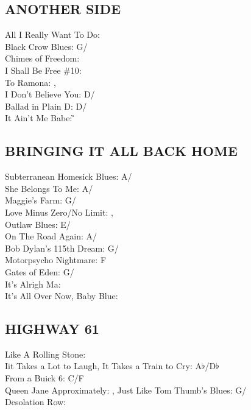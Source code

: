  \subsection{ANOTHER SIDE}
All I Really Want To Do: \A\\ Black Crow Blues: G/\C\\ Chimes of Freedom: \G\\ I Shall Be Free \#10: \G\\ To Ramona: \C,\\
 I Don't Believe You: D/\G\\ Ballad in Plain D: D/\G\\ It Ain't Me Babe: \G


\subsection{BRINGING IT ALL BACK HOME}
Subterranean Homesick Blues: A/\D\\ She Belongs To Me: A/\D\\ Maggie's Farm: G/\C\\ Love Minus Zero/No Limit: \E,\\
 Outlaw Blues: E/\A\\ On The Road Again: A/\D\\ Bob Dylan's 115th Dream: G/\C\\ Motorpsycho Nightmare: F\\ Gates of Eden: G/\C\\ It's Alrigh Ma: \E\\ It's All Over Now, Baby Blue: \E


\subsection{HIGHWAY 61}
Like A Rolling Stone: \C\\ Iit Takes a Lot to Laugh, It Takes a Train to Cry: A$\flat$/D$\flat$\\
From a Buick 6: C/F\\ Queen Jane Approximately: \C,
Just Like Tom Thumb's Blues: G/\C\\ Desolation Row: \E


